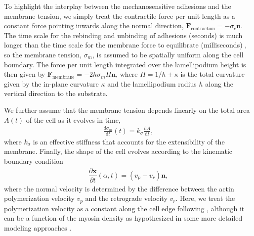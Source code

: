 \documentclass[12pt]{article}
\newcommand{\dd}{\mathrm{d}}
\newcommand{\mbf}{\boldsymbol}
\newcommand{\pdif}[2]{\dfrac{\partial #1}{\partial #2}}
\begin{document}
        To highlight the interplay between the mechanosensitive adhesions and the membrane tension, we simply treat the contractile force per unit length as a constant force pointing inwards along the normal direction, $\mbf{F}_{\text{contraction}} = -\sigma_c\mbf{n}$. 
        The time scale for the rebinding and unbinding of adhesions (seconds) \cite{chan2008traction} is much longer than the time scale for the membrane force to equilibrate (milliseconds) \cite{keren2008mechanism}, so the membrane tension, $\sigma_m$, is assumed to be spatially uniform along the cell boundary. The force per unit length integrated over the lamellipodium height is then given by $\mbf{F}_{\text{membrane}} = -2h\sigma_m H\mbf{n}$, where $H=1/h+\kappa$ is the total curvature given by the in-plane curvature $\kappa$ and the lamellipodium radius $h$ along the vertical direction to the substrate.
        
        We further assume that the membrane tension depends linearly on the total area $A(t)$ of the cell as it evolves in time, 
        \begin{align}
            \frac{\dd \sigma_m}{\dd t}(t) = k_\sigma \frac{\dd A}{\dd t}, %
        \end{align}
        where $k_\sigma$ is an effective stiffness that accounts for the extensibility of the membrane. 
        Finally, the shape of the cell evolves according to the kinematic boundary condition
        \begin{align}
            \pdif{\mbf{x}}{t}(\alpha,t) = (v_p - v_r)\mbf{n}, 
        \end{align}
        where the normal velocity is determined by the difference between the actin polymerization velocity $v_p$ and the retrograde velocity $v_r$. 
        Here, we treat the polymerization velocity as a constant along the cell edge following \cite{callan2008viscous,blanch2013spontaneous}, although it can be a function of the myosin density as hypothesized in some more detailed modeling approaches \cite{nickaeen2017free}. 
\end{document}
